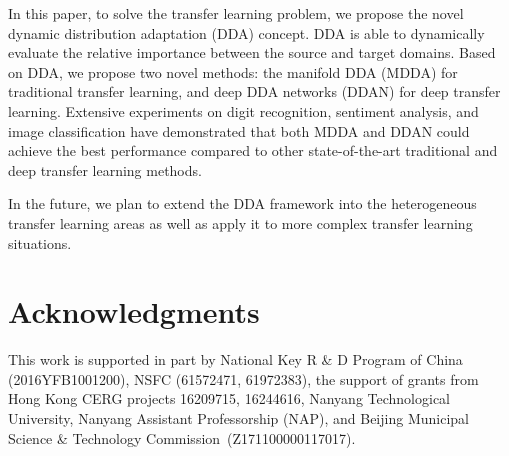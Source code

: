 \documentclass[acmsmall]{acmart}
\begin{document}
In this paper, to solve the transfer learning problem, we propose the novel dynamic distribution adaptation (DDA) concept. DDA is able to dynamically evaluate the relative importance between the source and target domains. Based on DDA, we propose two novel methods: the manifold DDA (MDDA) for traditional transfer learning, and deep DDA networks (DDAN) for deep transfer learning. Extensive experiments on digit recognition, sentiment analysis, and image classification have demonstrated that both MDDA and DDAN could achieve the best performance compared to other state-of-the-art traditional and deep transfer learning methods. 

In the future, we plan to extend the DDA framework into the heterogeneous transfer learning areas as well as apply it to more complex transfer learning situations.




\section*{Acknowledgments}

This work is supported in part by National Key R \& D Program of China (2016YFB1001200), NSFC (61572471, 61972383), the support of grants from Hong Kong CERG projects 16209715, 16244616, Nanyang Technological University, Nanyang Assistant Professorship (NAP), and Beijing Municipal Science \& Technology Commission~(Z171100000117017).




\end{document}
